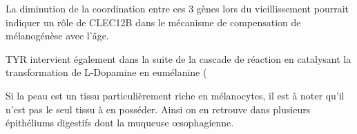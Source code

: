 


La diminution de la coordination entre ces 3 gènes lors du vieillissement pourrait indiquer un rôle de CLEC12B dans le mécanisme de compensation de mélanogénèse avec l'âge.

TYR intervient également dans la suite de la cascade de réaction en catalysant la transformation de L-Dopamine en eumélanine (



Si la peau est un tissu particulièrement riche en mélanocytes, il est à noter qu'il n'est pas le seul tissu à en posséder. Ainsi on en retrouve dans plusieurs épithéliums digestifs dont la muqueuse œsophagienne. 




